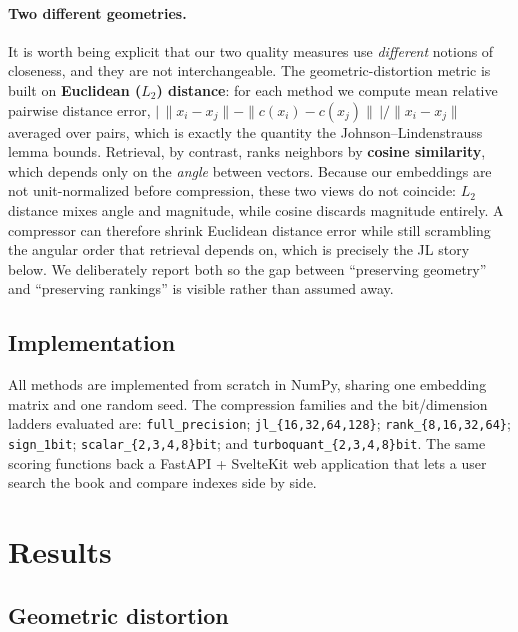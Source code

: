 \documentclass[11pt]{article}
\begin{document}
\paragraph{Two different geometries.} It is worth being explicit that our two quality measures use \emph{different} notions of closeness, and they are not interchangeable. The geometric-distortion metric is built on \textbf{Euclidean ($L_2$) distance}: for each method we compute mean relative pairwise distance error, $\bigl|\,\|x_i - x_j\| - \|c(x_i) - c(x_j)\|\,\bigr| / \|x_i - x_j\|$ averaged over pairs, which is exactly the quantity the Johnson--Lindenstrauss lemma bounds. Retrieval, by contrast, ranks neighbors by \textbf{cosine similarity}, which depends only on the \emph{angle} between vectors. Because our embeddings are not unit-normalized before compression, these two views do not coincide: $L_2$ distance mixes angle and magnitude, while cosine discards magnitude entirely. A compressor can therefore shrink Euclidean distance error while still scrambling the angular order that retrieval depends on, which is precisely the JL story below. We deliberately report both so the gap between ``preserving geometry'' and ``preserving rankings'' is visible rather than assumed away.

\subsection{Implementation}

\begin{sloppypar}
All methods are implemented from scratch in NumPy, sharing one embedding matrix and one random seed. The compression families and the bit/dimension ladders evaluated are: \texttt{full\_precision}; \texttt{jl\_\{16,32,64,128\}}; \texttt{rank\_\{8,16,32,64\}}; \texttt{sign\_1bit}; \texttt{scalar\_\{2,3,4,8\}bit}; and \texttt{turboquant\_\{2,3,4,8\}bit}. The same scoring functions back a FastAPI + SvelteKit web application that lets a user search the book and compare indexes side by side.
\end{sloppypar}

\section{Results}

\subsection{Geometric distortion}
\end{document}
